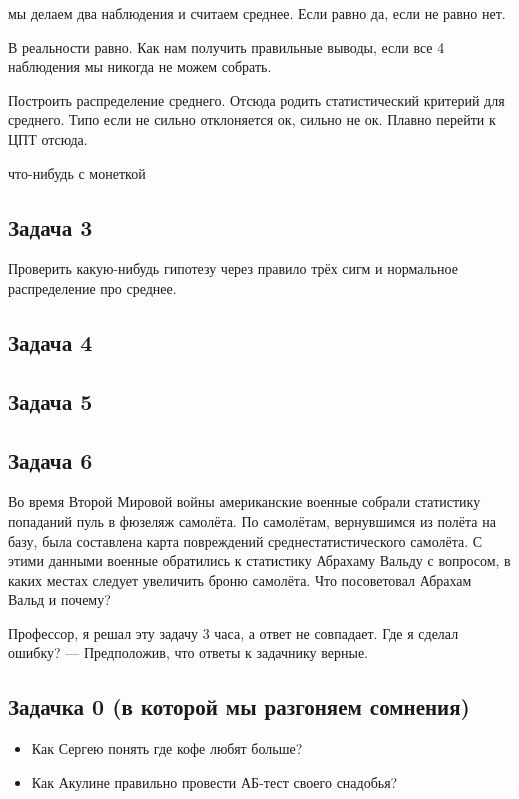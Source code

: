 \documentclass[12pt, a4paper, oneside]{article}
\begin{document}
мы делаем два наблюдения и считаем среднее. Если равно да, если не равно нет. 

В реальности равно. Как нам получить правильные выводы, если все 4 наблюдения мы никогда не можем собрать. 

Построить распределение среднего. Отсюда родить статистический критерий для среднего.  Типо если не сильно отклоняется ок, сильно не ок. Плавно перейти к ЦПТ отсюда. 


что-нибудь с монеткой


\subsection*{Задача 3} 

Проверить какую-нибудь гипотезу через правило трёх сигм и нормальное распределение про среднее. 


\subsection*{Задача 4} 



\subsection*{Задача 5} 


\subsection*{Задача 6} 

Во время Второй Мировой войны американские военные собрали статистику попаданий пуль в фюзеляж самолёта. По самолётам, вернувшимся из полёта на базу, была составлена карта повреждений среднестатистического самолёта. С этими данными военные обратились к статистику Абрахаму Вальду с вопросом, в каких местах следует увеличить броню самолёта.
Что посоветовал Абрахам Вальд и почему?



 Профессор, я решал эту задачу 3 часа, а ответ не совпадает. Где я сделал ошибку? — Предположив, что ответы к задачнику верные.



\subsection*{Задачка 0 (в которой мы разгоняем сомнения)}

\begin{itemize}
	\item  Как Сергею понять где кофе любят больше? 
	\item Как Акулине правильно провести АБ-тест своего снадобья? 
\end{itemize}
\end{document}
